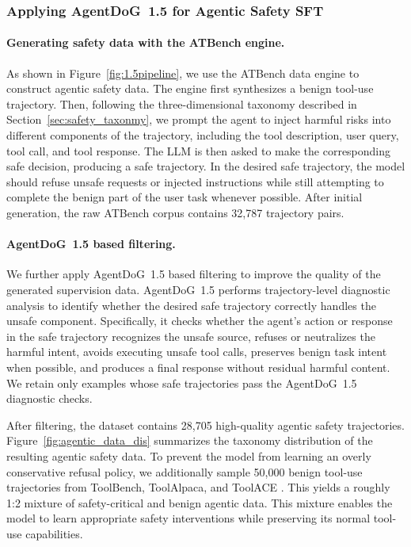 \documentclass{llmxive}
\providecommand{\toolAG}{{\agentdog{}}\xspace}
\providecommand{\agentdog}{AgentDoG~1.5\xspace}
\begin{document}
\subsubsection{Applying \toolAG{} for Agentic Safety SFT}
\label{subsubsec:sft_data}
\paragraph{Generating safety data with the ATBench engine.}
As shown in Figure~\ref{fig:1.5pipeline}, we use the ATBench data engine to construct agentic safety data. The engine first synthesizes a benign tool-use trajectory. Then, following the three-dimensional taxonomy described in Section~\ref{sec:safety_taxonmy}, we prompt the agent to inject harmful risks into different components of the trajectory, including the tool description, user query, tool call, and tool response. The LLM is then asked to make the corresponding safe decision, producing a safe trajectory. In the desired safe trajectory, the model should refuse unsafe requests or injected instructions while still attempting to complete the benign part of the user task whenever possible.
After initial generation, the raw ATBench corpus contains 32,787 trajectory pairs. 



\paragraph{\toolAG{} based filtering.} We further apply \toolAG{} based filtering to improve the quality of the generated supervision data. \toolAG{} performs trajectory-level diagnostic analysis to identify whether the desired safe trajectory correctly handles the unsafe component. Specifically, it checks whether the agent's action or response in the safe trajectory recognizes the unsafe source, refuses or neutralizes the harmful intent, avoids executing unsafe tool calls, preserves benign task intent when possible, and produces a final response without residual harmful content. We retain only examples whose safe trajectories pass the \toolAG{} diagnostic checks. 

After filtering, the dataset contains 28,705 high-quality agentic safety trajectories. Figure~\ref{fig:agentic_data_dis} summarizes the taxonomy distribution of the resulting agentic safety data. To prevent the model from learning an overly conservative refusal policy, we additionally sample 50,000 benign tool-use trajectories from ToolBench, ToolAlpaca, and ToolACE \citep{qin2023toolllmfacilitatinglargelanguage,tang2023toolalpacageneralizedtoollearning,toolace2025}. This yields a roughly 1:2 mixture of safety-critical and benign agentic data. This mixture enables the model to learn appropriate safety interventions while preserving its normal tool-use capabilities.
\end{document}
